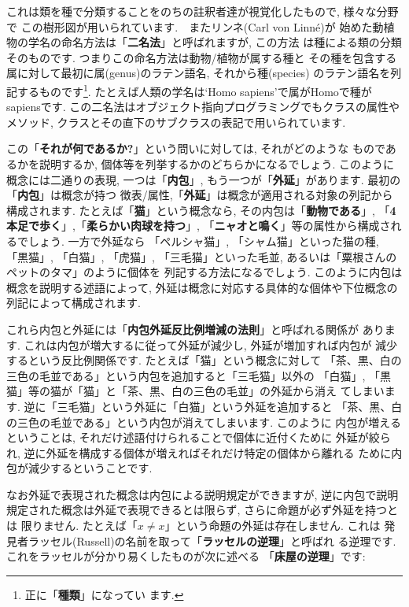 \documentclass[b5j,8pt,twocolumn]{ltjsarticle}
\begin{document}
これは類を種で分類することをのちの註釈者達が視覚化したもので, 様々な分野で
この樹形図が用いられています.　またリンネ(Carl von Linn\'e)が
始めた動植物の学名の命名方法は「\textbf{二名法}」と呼ばれますが, この方法
は種による類の分類そのものです. つまりこの命名方法は動物/植物が属する種と
その種を包含する属に対して最初に属(genus)のラテン語名, それから種(species)
のラテン語名を列記するものです\footnote{正に「\textbf{種類}」になってい
ます.}. たとえば人類の学名は`Homo sapiens'で属がHomoで種がsapiensです.
 この二名法はオブジェクト指向プログラミングでもクラスの属性やメソッド,
 クラスとその直下のサブクラスの表記で用いられています.
\newline


この「\textbf{それが何であるか?}」という問いに対しては, それがどのような
ものであるかを説明するか, 個体等を列挙するかのどちらかになるでしょう.
 このように概念には二通りの表現, 一つは「\textbf{内包}」, もう一つが「\textbf{外延}」があります. 最初の「\textbf{内包}」は概念が持つ
徴表/属性,「\textbf{外延}」は概念が適用される対象の列記から構成されます.
 たとえば「\textbf{猫}」という概念なら, その内包は「\textbf{動物である}」,
 「\textbf{4本足で歩く}」,「\textbf{柔らかい肉球を持つ}」,
 「\textbf{ニャオと鳴く}」等の属性から構成されるでしょう. 一方で外延なら
 「ペルシャ猫」, 「シャム猫」といった猫の種, 「黒猫」, 「白猫」, 「虎猫」,
 「三毛猫」といった毛並, あるいは「粟根さんのペットのタマ」のように個体を
列記する方法になるでしょう. このように内包は概念を説明する述語によって,
 外延は概念に対応する具体的な個体や下位概念の列記によって構成されます.
\newline


これら内包と外延には「\textbf{内包外延反比例増減の法則}」と呼ばれる関係が
あります. これは内包が増大するに従って外延が減少し, 外延が増加すれば内包が
減少するという反比例関係です. たとえば「猫」という概念に対して
「茶、黒、白の三色の毛並である」という内包を追加すると「三毛猫」以外の
「白猫」, 「黒猫」等の猫が「猫」と「茶、黒、白の三色の毛並」の外延から消え
てしまいます. 逆に「三毛猫」という外延に「白猫」という外延を追加すると
「茶、黒、白の三色の毛並である」という内包が消えてしまいます. このように
内包が増えるということは, それだけ述語付けられることで個体に近付くために
外延が絞られ, 逆に外延を構成する個体が増えればそれだけ特定の個体から離れる
ために内包が減少するということです.
\newline

なお外延で表現された概念は内包による説明規定ができますが, 逆に内包で説明
規定された概念は外延で表現できるとは限らず, さらに命題が必ず外延を持つとは
限りません. たとえば「$x \neq x$」という命題の外延は存在しません. これは
発見者ラッセル(Russell)の名前を取って「\textbf{ラッセルの逆理}」と呼ばれ
る逆理です. これをラッセルが分かり易くしたものが次に述べる
「\textbf{床屋の逆理}」です:
\end{document}
